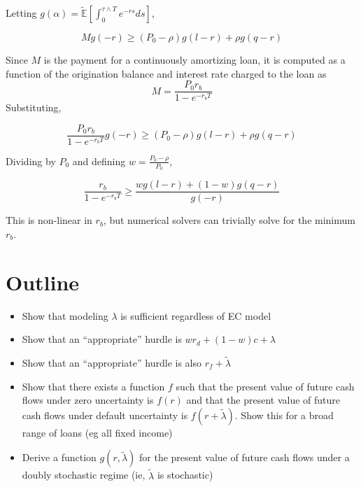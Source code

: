 \documentclass{article}
\begin{document}
Letting \(g(\alpha)=\mathbb{\tilde{E}}\left[ \int_0 ^ {\tau \wedge T} e^{-rs} ds \right]\), 

\[
M g(-r) \geq 
\left(P_0-\rho \right)g(l-r)
+\rho g(q-r)
\]

Since \(M\) is the payment for a continuously amortizing loan, it is computed as a function of the origination balance and interest rate charged to the loan as 
\[M=\frac{P_0 r_b}{1-e^{-r_b T}}\]
Substituting,

\[
\frac{P_0 r_b}{1-e^{-r_b T}} g(-r) \geq 
\left(P_0-\rho \right)g(l-r)
+\rho g(q-r)
\]

Dividing by \(P_0\) and defining \(w=\frac{P_0-\rho}{P_0}\),

\[
\frac{ r_b}{1-e^{-r_b T}}  \geq 
\frac{wg(l-r)
+(1-w) g(q-r)}{g(-r)}
\]

This is non-linear in \(r_b\), but numerical solvers can trivially solve for the minimum \(r_b\).



\section{Outline}
\begin{itemize}
\item Show that modeling \(\lambda\) is sufficient regardless of EC model
\item Show that an ``appropriate'' hurdle is \(w r_d + (1-w)c+\lambda\)
\item Show that an ``appropriate'' hurdle is also \(r_f+\tilde{\lambda}\)
\item Show that there exists a function \(f\) such that the present value of future cash flows under zero uncertainty is \(f(r)\) and that the present value of future cash flows under default uncertainty is \(f(r+\tilde{\lambda})\).  Show this for a broad range of loans (eg all fixed income)
\item Derive a function \(g(r, \tilde{\lambda})\) for the present value of future cash flows under a doubly stochastic regime (ie, \(\tilde{\lambda}\) is stochastic)
\end{itemize}
\end{document}
